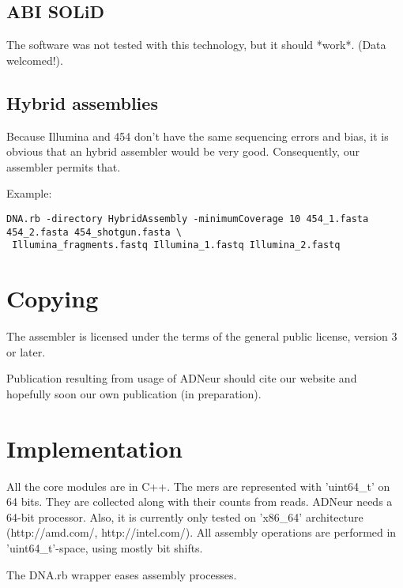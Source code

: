 \documentclass{article}
\begin{document}
\subsection{ABI SOLiD}

The software was not tested with this technology, but it should *work*.
(Data welcomed!).

\subsection{Hybrid assemblies}

Because Illumina and 454 don't have the same sequencing errors  and bias, it is obvious that
an hybrid assembler would be very good. Consequently, our assembler permits that.

Example:
\begin{verbatim}
DNA.rb -directory HybridAssembly -minimumCoverage 10 454_1.fasta 454_2.fasta 454_shotgun.fasta \
 Illumina_fragments.fastq Illumina_1.fastq Illumina_2.fastq 
\end{verbatim}


\section{Copying}

The assembler is licensed under the terms of the general public license, version 3 or later.

Publication resulting from usage of ADNeur should cite our website and hopefully soon our own publication (in preparation).

\section{Implementation}

All the core modules are in C++. The mers are represented with 'uint64\_t' on 64 bits. They are collected along with their  counts from reads. ADNeur needs a 64-bit processor.
Also, it is currently only tested on
'x86\_64' architecture (http://amd.com/, http://intel.com/). 
All assembly operations are performed in 'uint64\_t'-space, using mostly bit shifts.

The DNA.rb wrapper eases assembly processes.
\end{document}
